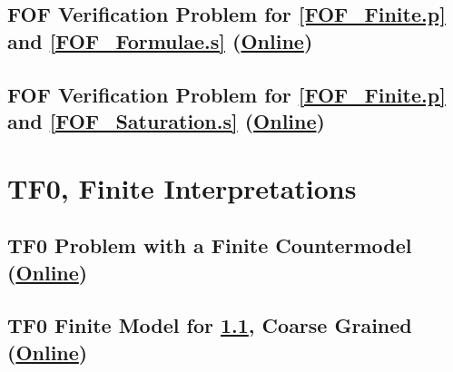 \documentclass{easychair}
\begin{document}
\begin{minipage}{\textwidth}
\subsection{FOF Verification Problem for \ref{FOF_Finite.p} and \ref{FOF_Formulae.s}
(\href{https://raw.githubusercontent.com/GeoffsPapers/InterpretationFormat/master/Examples/FOF_Formulae.s.p}{Online})}
\label{FOF_Formulae.s.p}
\begin{small}

\end{small}
\end{minipage}

\begin{minipage}{\textwidth}
\subsection{FOF Verification Problem for \ref{FOF_Finite.p} and \ref{FOF_Saturation.s}
(\href{https://raw.githubusercontent.com/GeoffsPapers/InterpretationFormat/master/Examples/FOF_Saturation.s.p}{Online})}
\label{FOF_Saturation.s.p}
\begin{small}

\end{small}
\end{minipage}

\begin{minipage}{\textwidth}
\section{TF0, Finite Interpretations}
\label{TF0Finite}

\subsection{TF0 Problem with a Finite Countermodel
(\href{https://raw.githubusercontent.com/GeoffsPapers/InterpretationFormat/master/Examples/TFF_Finite.p}{Online})}
\label{TFF_Finite.p}
\begin{small}

\end{small}
\end{minipage}

\begin{minipage}{\textwidth}
\subsection{TF0 Finite Model for \ref{TFF_Finite.p}, Coarse Grained
(\href{https://raw.githubusercontent.com/GeoffsPapers/InterpretationFormat/master/Examples/TFF_Finite.s}{Online})}
\label{TFF_Finite.s}
\begin{small}

\end{small}
\end{minipage}
\end{document}
